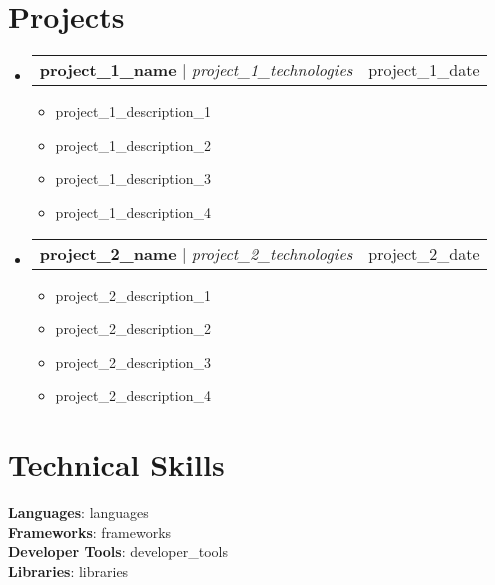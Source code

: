 \documentclass[letterpaper,11pt]{article}
\makeatletter
\newcommand{\resumeItem}[1]{
  \item\small{
    {#1 \vspace{-2pt}}
  }
}
\newcommand{\resumeProjectHeading}[2]{
    \item
    \begin{tabular*}{0.97\textwidth}{l@{\extracolsep{\fill}}r}
      \small#1 & #2 \\
    \end{tabular*}\vspace{-7pt}
}
\newcommand{\resumeSubHeadingListStart}{\begin{itemize}[leftmargin=0.15in, label={}]}
\newcommand{\resumeSubHeadingListEnd}{\end{itemize}}
\newcommand{\resumeItemListStart}{\begin{itemize}}
\newcommand{\resumeItemListEnd}{\end{itemize}\vspace{-5pt}}
\makeatother
\begin{document}
\section{Projects}
    \resumeSubHeadingListStart
      \resumeProjectHeading
          {\textbf{{project_1_name}} $|$ \emph{{project_1_technologies}}}{{{project_1_date}}}
          \resumeItemListStart
            \resumeItem{{project_1_description_1}}
            \resumeItem{{project_1_description_2}}
            \resumeItem{{project_1_description_3}}
            \resumeItem{{project_1_description_4}}
          \resumeItemListEnd
      \resumeProjectHeading
          {\textbf{{project_2_name}} $|$ \emph{{project_2_technologies}}}{{{project_2_date}}}
          \resumeItemListStart
            \resumeItem{{project_2_description_1}}
            \resumeItem{{project_2_description_2}}
            \resumeItem{{project_2_description_3}}
            \resumeItem{{project_2_description_4}}
          \resumeItemListEnd
    \resumeSubHeadingListEnd


\section{Technical Skills}
 \begin{itemize}[leftmargin=0.15in, label={}]
    \small{\item{
     \textbf{Languages}{: {{languages}}} \\
     \textbf{Frameworks}{: {{frameworks}}} \\
     \textbf{Developer Tools}{: {{developer_tools}}} \\
     \textbf{Libraries}{: {{libraries}}}
    }}
 \end{itemize}


\end{document}
